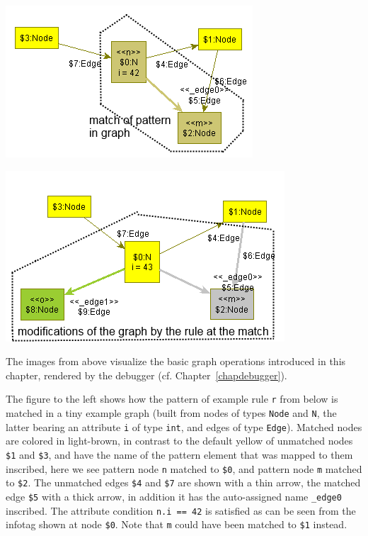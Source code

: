 
\begin{example}

\begin{center}
  \parbox{0.45\linewidth}{\includegraphics[width=\linewidth]{fig/exmatch}}
  \parbox{0.45\linewidth}{\includegraphics[width=\linewidth]{fig/exrewrite}}
\end{center}

The images from above visualize the basic graph operations introduced in this chapter, rendered by the debugger (cf. Chapter~\ref{chapdebugger}).

The figure to the left shows how the pattern of example rule \texttt{r} from below is matched in a tiny example graph (built from nodes of types \texttt{Node} and \texttt{N}, the latter bearing an attribute \texttt{i} of type \texttt{int}, and edges of type \texttt{Edge}). 
Matched nodes are colored in light-brown, in contrast to the default yellow of unmatched nodes \verb#$1# and \verb#$3#, 
and have the name of the pattern element that was mapped to them inscribed, here we see pattern node \texttt{n} matched to \verb#$0#, and pattern node \texttt{m} matched to \verb#$2#.
The unmatched edges \verb#$4# and \verb#$7# are shown with a thin arrow, the matched edge \verb#$5# with a thick arrow, in addition it has the auto-assigned name \texttt{\_edge0} inscribed.
The attribute condition \verb#n.i == 42# is satisfied as can be seen from the infotag shown at node \verb#$0#.
Note that \texttt{m} could have been matched to \verb#$1# instead.


\end{example}
